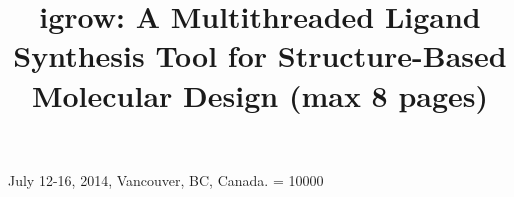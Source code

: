 \documentclass{sig-alternate}
\begin{document}
%
 {July 12-16, 2014, Vancouver, BC, Canada.}
\widowpenalty = 10000

\title{igrow: A Multithreaded Ligand Synthesis Tool for Structure-Based Molecular Design (max 8 pages)}
%
%
%
%
%
\end{document}
